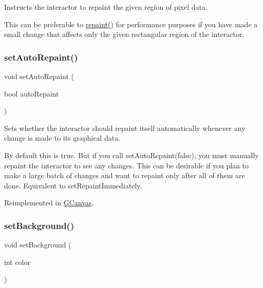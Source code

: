 Instructs the interactor to repaint the given region of pixel data. 

This can be preferable to \mbox{\hyperlink{classGDrawingSurface_a4a8ae47b42f1e6a41b65d3546df46218}{repaint()}} for performance purposes if you have made a small change that affects only the given rectangular region of the interactor. \mbox{\label{classGDrawingSurface_adf10848319457bd6df4c657bf8872bee}} 
\subsubsection{\texorpdfstring{set\+Auto\+Repaint()}{setAutoRepaint()}}
{\footnotesize\ttfamily void set\+Auto\+Repaint (\begin{DoxyParamCaption}\item[{bool}]{auto\+Repaint }\end{DoxyParamCaption})\hspace{0.3cm}{\ttfamily [virtual]}}



Sets whether the interactor should repaint itself automatically whenever any change is made to its graphical data. 

By default this is true. But if you call set\+Auto\+Repaint(false), you must manually repaint the interactor to see any changes. This can be desirable if you plan to make a large batch of changes and want to repaint only after all of them are done. Equivalent to set\+Repaint\+Immediately. 

Reimplemented in \mbox{\hyperlink{classGCanvas_ade731c276cd0bcd37639280d06571333}{G\+Canvas}}.

\mbox{\label{classGDrawingSurface_aba673fd56570a074aba10fa059524b96}} 
\subsubsection{\texorpdfstring{set\+Background()}{setBackground()}\hspace{0.1cm}{\footnotesize\ttfamily [1/2]}}
{\footnotesize\ttfamily void set\+Background (\begin{DoxyParamCaption}\item[{int}]{color }\end{DoxyParamCaption})\hspace{0.3cm}{\ttfamily [virtual]}}




